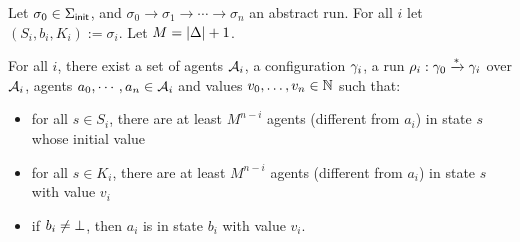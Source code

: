 %	
%	
%	
%	
%	
%	


\begin{lemma}
	\label{lem:correctness-construction}
	Let $\sigma_0 \in \Sigma_{\mathsf{init}}$, and $\sigma_0 \to \sigma_1 \to \cdots \to \sigma_n$ an abstract run. For all $i$ let $(S_i, b_i, K_i) := \sigma_i$. Let $M = |\Delta|+1$.
	
	For all $i$, there exist a set of agents $\mathcal{A}_i$, a configuration $\gamma_i$, a run $\rho_i : \gamma_0 \xrightarrow{*} \gamma_i$ over $\mathcal{A}_i$, agents $a_0, \cdots, a_n \in \mathcal{A}_i$ and values $v_0, \ldots, v_n \in \mathbb{N}$ such that:
	\begin{itemize}
		\item for all $s \in S_i$, there are at least $M^{n-i}$ agents (different from $a_i$) in state $s$ whose initial value 
		
		\item for all $s \in K_i$, there are at least $M^{n-i}$ agents (different from $a_i$) in state $s$ with value $v_i$
		
		\item if $b_i \neq \bot$, then $a_i$ is in state $b_i$ with value $v_i$.
	\end{itemize}
\end{lemma}



